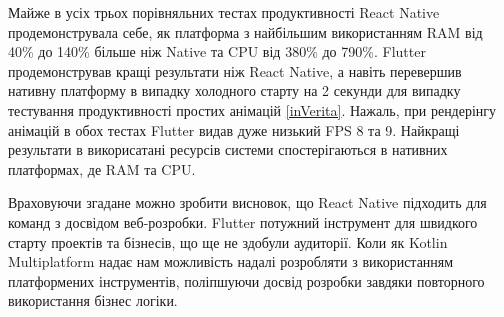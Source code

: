 Майже в усіх трьох порівняльних тестах продуктивності React Native продемонструвала себе, як платформа з найбільшим
використанням RAM від 40\% до 140\% більше ніж Native та CPU від 380\% до 790\%. Flutter продемонстрував кращі результати
ніж React Native, а навіть перевершив нативну платформу в випадку холодного старту на 2 секунди для випадку тестування
продуктивності простих анімацій \ref{inVerita}.
Нажаль, при рендерінгу анімацій в обох тестах Flutter видав дуже низький FPS 8 та 9.
Найкращі результати в викорисатані ресурсів системи спостерігаються в нативних платформах, де RAM та CPU.

Враховуючи згадане можно зробити висновок, що React Native підходить для команд з досвідом веб-розробки.
Flutter потужний інструмент для швидкого старту проектів та бізнесів, що ще не здобули аудиторії.
Коли як Kotlin Multiplatform надає нам можливість надалі розробляти з використанням платформених інструментів,
поліпшуючи досвід розробки завдяки повторного використання бізнес логіки.
